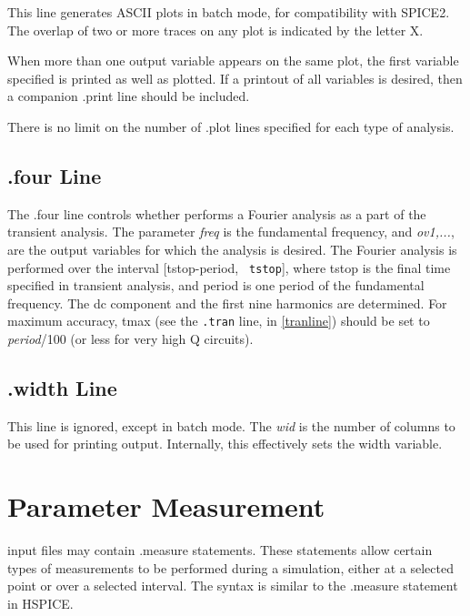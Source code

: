 This line generates ASCII plots in batch mode, for compatibility
with SPICE2.  The overlap of two or more traces on any plot is
indicated by the letter X.

When more than one output variable appears on the same plot, the first
variable specified is printed as well as plotted.  If a printout of
all variables is desired, then a companion {\vt .print} line should be
included.

There is no limit on the number of {\vt .plot} lines specified for
each type of analysis.

\subsection{{\vt .four} Line}

The {\vt .four} line controls whether {\WRspice} performs a Fourier
analysis as a part of the transient analysis.  The parameter {\it
freq\/} is the fundamental frequency, and {\it ov1,...\/}, are the
output variables for which the analysis is desired.  The Fourier
analysis is performed over the interval [{\vt tstop}-period, {\tt
tstop}], where {\vt tstop} is the final time specified in transient
analysis, and {\vt period} is one period of the fundamental frequency. 
The dc component and the first nine harmonics are determined.  For
maximum accuracy, {\vt tmax} (see the {\tt .tran} line, in
\ref{tranline}) should be set to {\it period}/100 (or less for very
high Q circuits).

\subsection{{\vt .width} Line}
This line is ignored, except in batch mode.  The {\it wid} is the
number of columns to be used for printing output.  Internally, this
effectively sets the {\et width} variable.


\section{Parameter Measurement}


{\WRspice} input files may contain {\vt .measure} statements.  These
statements allow certain types of measurements to be performed during
a simulation, either at a selected point or over a selected interval. 
The syntax is similar to the {\vt .measure} statement in HSPICE.

